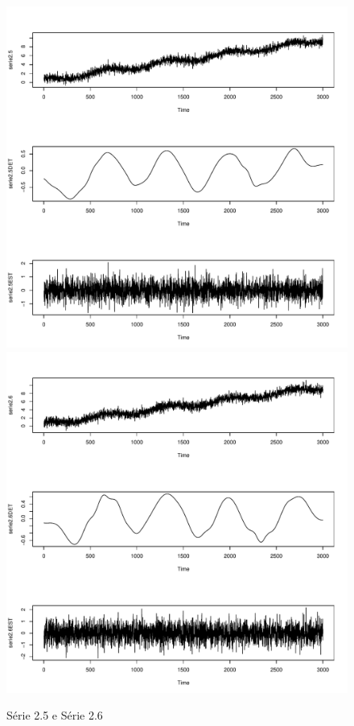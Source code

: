 \graphicspath{{imagens/}}
\begin{figure}[H]
\begin{center}
  \includegraphics[scale=0.43]{serie2_5.pdf} \quad
  \includegraphics[scale=0.43]{serie2_6.pdf}
  \caption{Série 2.5 e Série 2.6}

\end{center}
\end{figure}


